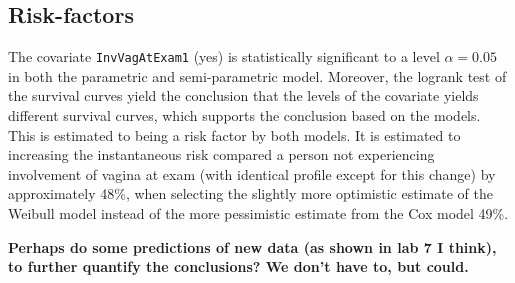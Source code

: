 \documentclass[
]{article}
\begin{document}
\hypertarget{risk-factors}{%
\subsection{Risk-factors}\label{risk-factors}}

The covariate \texttt{InvVagAtExam1} (yes) is statistically significant to a level \(\alpha = 0.05\) in both the parametric and semi-parametric model. Moreover, the logrank test of the survival curves yield the conclusion that the levels of the covariate yields different survival curves, which supports the conclusion based on the models. This is estimated to being a risk factor by both models. It is estimated to increasing the instantaneous risk compared a person not experiencing involvement of vagina at exam (with identical profile except for this change) by approximately 48\%, when selecting the slightly more optimistic estimate of the Weibull model instead of the more pessimistic estimate from the Cox model 49\%.

\textbf{Perhaps do some predictions of new data (as shown in lab 7 I think), to further quantify the conclusions? We don't have to, but could.}
\end{document}
